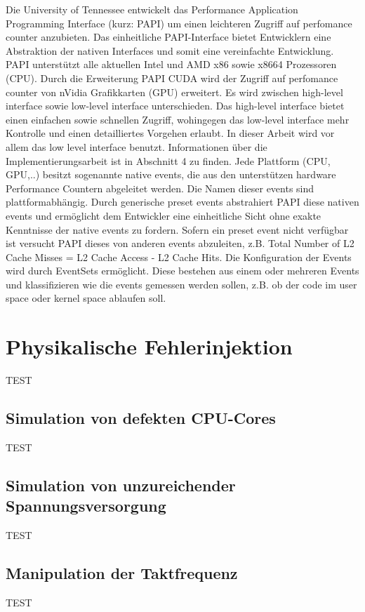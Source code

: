 Die University of Tennessee entwickelt das Performance Application Programming Interface
(kurz: PAPI) um einen leichteren Zugriff auf perfomance counter anzubieten. Das einheitliche
PAPI-Interface bietet Entwicklern eine Abstraktion der nativen Interfaces und somit eine
vereinfachte Entwicklung. 
PAPI unterstützt alle aktuellen Intel und AMD x86 sowie x8664 Prozessoren (CPU). Durch die
Erweiterung PAPI CUDA wird der Zugriff auf perfomance counter von nVidia Grafikkarten (GPU)
erweitert.
Es wird zwischen high-level interface sowie low-level interface unterschieden. Das high-level
interface bietet einen einfachen sowie schnellen Zugriff, wohingegen das low-level interface
mehr Kontrolle und einen detailliertes Vorgehen erlaubt. In dieser Arbeit wird vor allem das low
level interface benutzt. Informationen über die Implementierungsarbeit ist in Abschnitt 4 zu
finden.
Jede Plattform (CPU, GPU,..) besitzt sogenannte native events, die aus den unterstützen
hardware Performance Countern abgeleitet werden. Die Namen dieser events sind
plattformabhängig. Durch generische preset events abstrahiert PAPI diese nativen events und
ermöglicht dem Entwickler eine einheitliche Sicht ohne exakte Kenntnisse der native events zu
fordern. Sofern ein preset event nicht verfügbar ist versucht PAPI dieses von anderen events
abzuleiten, z.B. Total Number of L2 Cache Misses = L2 Cache Access - L2 Cache Hits.
Die Konfiguration der Events wird durch EventSets ermöglicht. Diese bestehen aus einem oder
mehreren Events und klassifizieren wie die events gemessen werden sollen, z.B. ob der code
im user space oder kernel space ablaufen soll.

\section{Physikalische Fehlerinjektion}

TEST

\subsection{Simulation von defekten CPU-Cores}
TEST

\subsection{Simulation von unzureichender Spannungsversorgung}
TEST
\subsection{Manipulation der Taktfrequenz}
TEST

